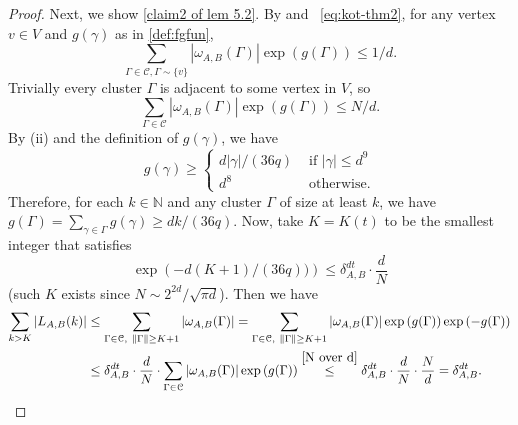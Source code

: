 \documentclass{amsart}
\theoremstyle{definition}
\newcommand{\we}{\omega}
\newcommand{\NN}{\mathbb{N}}
\newcommand{\beq}[1]{\begin{equation}\label{#1}}
\newcommand{\enq}[0]{\end{equation}}
\newcommand{\0}[0]{\emptyset}
\begin{document}
\begin{proof}
Next, we show \eqref{claim2 of lem 5.2}. 
By  and ~\eqref{eq:kot-thm2}, for any vertex $v\in V$ and $g(\gamma)$ as in \eqref{def:fgfun},
\[
\sum_{\Gamma\in \mathcal{C}, \Gamma\sim \{v\}}|\we_{A,B}(\Gamma)|\exp\left(g(\Gamma)\right)\leq 1/d.
\]
Trivially every cluster $\Gamma$ is adjacent to some vertex in $V$, so
\beq{N over d}
\sum_{\Gamma\in \mathcal{C}}|\we_{A,B}(\Gamma)|\exp\left(g(\Gamma)\right)\leq N/d.
\enq
By  (ii) and the definition of $g(\gamma)$, we have
\[
g(\gamma)\geq
\begin{cases}
d|\gamma|/(36q) & \text{ if } |\gamma|\leq d^9\\
d^8 & \text{ otherwise}.
\end{cases}
\]
Therefore, for each $k\in\NN$ and any cluster $\Gamma$ of size at least $k$, we have $g(\Gamma)=\sum_{\gamma\in\Gamma}g(\gamma)\geq dk/(36q)$. 
Now, take $K=K(t)$ to be the smallest integer that satisfies
\[
\exp\left(-d(K+1)/(36q))\right) \leq \delta_{A, B}^{dt}\cdot \frac{d}{N}
\]
(such $K$ exists since $N\sim 2^{2d}/\sqrt{\pi d}$). Then we have
\[
\begin{split}
\sum_{k>K}|L_{A, B}(k)|&\leq \sum_{\Gamma\in \mathcal{C},\  \lVert \Gamma\rVert\geq K+1}|\we_{A,B}(\Gamma)|=\sum_{\Gamma\in \mathcal{C},\  \lVert \Gamma\rVert\geq K+1}|\we_{A,B}(\Gamma)|\exp\left(g(\Gamma)\right)\exp\left(-g(\Gamma)\right)\\
&\leq \delta_{A, B}^{dt}\cdot \frac{d}{N}\cdot\sum_{\Gamma\in \mathcal{C}}|\we_{A,B}(\Gamma)|\exp\left(g(\Gamma)\right) \stackrel{\eqref{N over d}}{\leq} \delta_{A, B}^{dt}\cdot \frac{d}{N}\cdot \frac{N}{d}=\delta_{A, B}^{dt}.
\end{split}
\]
\end{proof}
\end{document}
